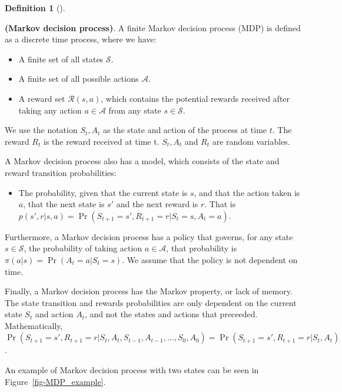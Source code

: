 \documentclass[
  letterpaper,
]{report}
\providecommand{\tightlist}{%
  \setlength{\itemsep}{0pt}\setlength{\parskip}{0pt}}\usepackage{longtable,booktabs,array}
\theoremstyle{plain}
\theoremstyle{definition}
\theoremstyle{definition}
\newtheorem{definition}{Definition}[chapter]
\theoremstyle{remark}
\begin{document}
\leavevmode{}%
\begin{definition}[]\label{def-Markov_decision_process}

\textbf{(Markov decision process)}. A finite Markov decision process
(MDP) is defined as a discrete time process, where we have:

\begin{itemize}
\tightlist
\item
  A finite set of all states \(\mathcal{S}\).
\item
  A finite set of all possible actions \(\mathcal{A}\).
\item
  A reward set \(\mathcal{R}(s,a)\), which contains the potential
  rewards received after taking any action \(a\in\mathcal{A}\) from any
  state \(s\in\mathcal{S}\).
\end{itemize}

We use the notation \(S_t, A_t\) as the state and action of the process
at time \(t\). The reward \(R_t\) is the reward received at time t.
\(S_t,A_t\) and \(R_t\) are random variables.

A Markov decision process also has a model, which consists of the state
and reward transition probabilities:

\begin{itemize}
\tightlist
\item
  The probability, given that the current state is \(s\), and that the
  action taken is \(a\), that the next state is \(s'\) and the next
  reward is \(r\). That is
  \(p(s',r|s,a) = \Pr(S_{t+1} = s', R_{t+1} = r | S_t = s, A_t = a)\).
\end{itemize}

Furthermore, a Markov decision process has a policy that governs, for
any state \(s\in\mathcal{S}\), the probability of taking action
\(a\in\mathcal{A}\), that probability is
\(\pi(a|s) = \Pr(A_t = a|S_t = s)\). We assume that the policy is not
dependent on time.

Finally, a Markov decision process has the Markov property, or lack of
memory. The state transition and rewards probabilities are only
dependent on the current state \(S_t\) and action \(A_t\), and not the
states and actions that preceeded. Mathematically,
\(\Pr(S_{t+1} = s', R_{t+1} = r|S_t, A_t, S_{t-1}, A_{t-1}, \dots , S_0, A_0) = \Pr(S_{t+1} = s', R_{t+1} = r | S_t, A_t)\).

\end{definition}

An example of Markov decision process with two states can be seen in
Figure~\ref{fig-MDP_example}.
\end{document}
